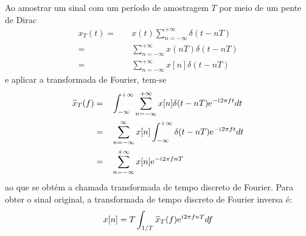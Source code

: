 \documentclass[12pt,a4paper]{report}
\newcommand{\I}{{\mathrm{i}\mkern1mu}}
\newcommand{\euler}{{\mathrm{e}\mkern1mu}}
\begin{document}
  Ao amostrar um sinal com um período de amostragem $T$ por meio de um pente de Dirac
  \begin{equation}
    \begin{split}
      x_T(t) = &\quad x(t) \sum_{n = -\infty}^{+\infty} \delta(t - n T) \\
      = &\quad \sum_{n = -\infty}^{+\infty} x(n T) \delta(t - n T) \\
      = &\quad \sum_{n = -\infty}^{+\infty} x[n] \delta(t - n T)
    \end{split}
    \label{eq:dirac_comb}
  \end{equation}
  e aplicar a transformada de Fourier, tem-se
  \begin{equation}
    \begin{split}
      \widehat{x}_T(f) = &\quad \int_{-\infty}^{+\infty} \sum_{n = -\infty}^{+\infty}
                                x[n] \delta(t - n T) \euler^{-\I 2 \pi f t} dt
      \\ = &\quad \sum_{n = -\infty}^{\infty} x[n] \int_{-\infty}^{+\infty}
                                \delta(t - n T) \euler^{-\I 2 \pi f t} dt
      \\ = &\quad \sum_{n = -\infty}^{+\infty} x[n] \euler^{-\I 2 \pi f n T}
    \end{split}
  \end{equation}
  ao que se obtém a chamada transformada de tempo discreto de Fourier. Para obter o sinal original, a
  transformada de tempo discreto de Fourier inversa é:
  \begin{equation}
    x[n] = T \int_{1/T} \widehat{x}_T(f) \euler^{\I 2 \pi f n T} df
  \end{equation}
\end{document}
